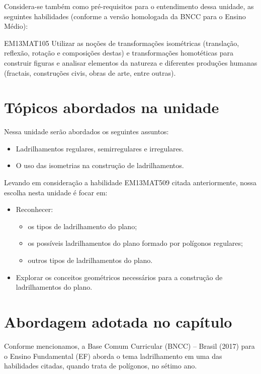 \begin{apresentacao}
Considera-se também como pré-requisitos para o entendimento dessa unidade, as seguintes habilidades (conforme a versão homologada da BNCC para o Ensino Médio):
\begin{habilities}{EM13MAT105} 
Utilizar as noções de transformações isométricas (translação, reflexão,
rotação e composições destas) e transformações homotéticas para construir figuras e
analisar elementos da natureza e diferentes produções humanas (fractais, construções
civis, obras de arte, entre outras).
\end{habilities}

\section*{Tópicos abordados na unidade}
Nessa unidade serão abordados os seguintes assuntos:
\begin{itemize}
\item  Ladrilhamentos regulares, semirregulares e irregulares.
\item  O uso das isometrias na construção de ladrilhamentos.
\end{itemize}
	

Levando em consideração a habilidade EM13MAT509 citada anteriormente, nossa escolha nesta unidade é focar em:

\vspace{-1em}
\begin{itemize}
\item Reconhecer: 
\vspace{-.5em}
\begin{itemize}
\item os tipos de ladrilhamento do plano;
\item os possíveis ladrilhamentos do plano formado por polígonos regulares;
\item outros tipos de ladrilhamentos do plano.
\end{itemize}
\vspace{-.5em}
\item Explorar os conceitos geométricos necessários para a construção de ladrilhamentos do plano.
\end{itemize}
\vspace{-1em}


\section*{Abordagem adotada no capítulo}

Conforme mencionamos, a Base Comum Curricular (BNCC) – Brasil (2017) para o Ensino Fundamental (EF) aborda o tema ladrilhamento em uma das habilidades citadas, quando trata de polígonos, no sétimo ano.


\end{apresentacao}
